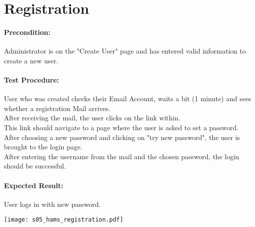 \documentclass{scrreprt}
\begin{document}
\begin{minipage}[c]{0.4\textwidth}
\section{Registration}

\paragraph{Precondition:}
Administrator is on the "Create User" page and has entered valid information to create a new user.\\

\paragraph{Test Procedure:}
User who was created checks their Email Account, waits a bit (1 minute) and sees whether a registration Mail arrives.\\
After receiving the mail, the user clicks on the link within.\\
This link should navigate to a page where the user is asked to set a password.\\
After choosing a new password and clicking on "try new password", the user is brought to the login page.\\
After entering the username from the mail and the chosen password, the
login should be successful.\\

\paragraph{Expected Result:}
User logs in with new password.

\end{minipage}
\hfill
\begin{minipage}[c]{0.5\textwidth}
	\texttt{[image: s05\_hams\_registration.pdf]}
\end{minipage}
\end{document}
